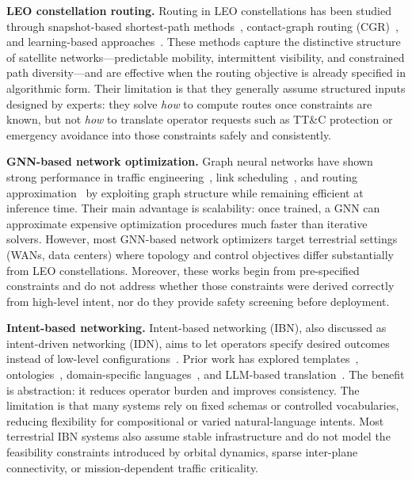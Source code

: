 \documentclass[10pt, conference, letterpaper]{IEEEtran}
\begin{document}
\noindent\textbf{LEO constellation routing.}
Routing in LEO constellations has been studied through snapshot-based
shortest-path methods~\cite{snapshot_routing}, contact-graph routing
(CGR)~\cite{cgr}, and learning-based
approaches~\cite{drl_leo1,drl_leo2}. These methods capture the
distinctive structure of satellite networks---predictable mobility,
intermittent visibility, and constrained path diversity---and are
effective when the routing objective is already specified in
algorithmic form. Their limitation is that they generally assume
structured inputs designed by experts: they solve \emph{how} to
compute routes once constraints are known, but not \emph{how} to
translate operator requests such as TT\&C protection or emergency
avoidance into those constraints safely and consistently.

\noindent\textbf{GNN-based network optimization.}
Graph neural networks have shown strong performance in traffic
engineering~\cite{gnn_te}, link scheduling~\cite{gnn_scheduling},
and routing approximation~\cite{gnn_routing,routenet} by exploiting
graph structure while remaining efficient at inference time. Their
main advantage is scalability: once trained, a GNN can approximate
expensive optimization procedures much faster than iterative solvers.
However, most GNN-based network optimizers target terrestrial settings
(WANs, data centers) where topology and control objectives differ
substantially from LEO constellations. Moreover, these works begin
from pre-specified constraints and do not address whether those
constraints were derived correctly from high-level intent, nor do
they provide safety screening before deployment.

\noindent\textbf{Intent-based networking.}
Intent-based networking (IBN), also discussed as intent-driven
networking (IDN), aims to let operators specify desired outcomes
instead of low-level
configurations~\cite{ibn_survey,ibn_framework}. Prior work has
explored templates~\cite{ibn_template},
ontologies~\cite{ibn_ontology}, domain-specific
languages~\cite{nile}, and LLM-based
translation~\cite{llm_network1,llm_network2}. The benefit is
abstraction: it reduces operator burden and improves consistency.
The limitation is that many systems rely on fixed schemas or
controlled vocabularies, reducing flexibility for compositional or
varied natural-language intents. Most terrestrial IBN systems also
assume stable infrastructure and do not model the feasibility
constraints introduced by orbital dynamics, sparse inter-plane
connectivity, or mission-dependent traffic criticality.
\end{document}
